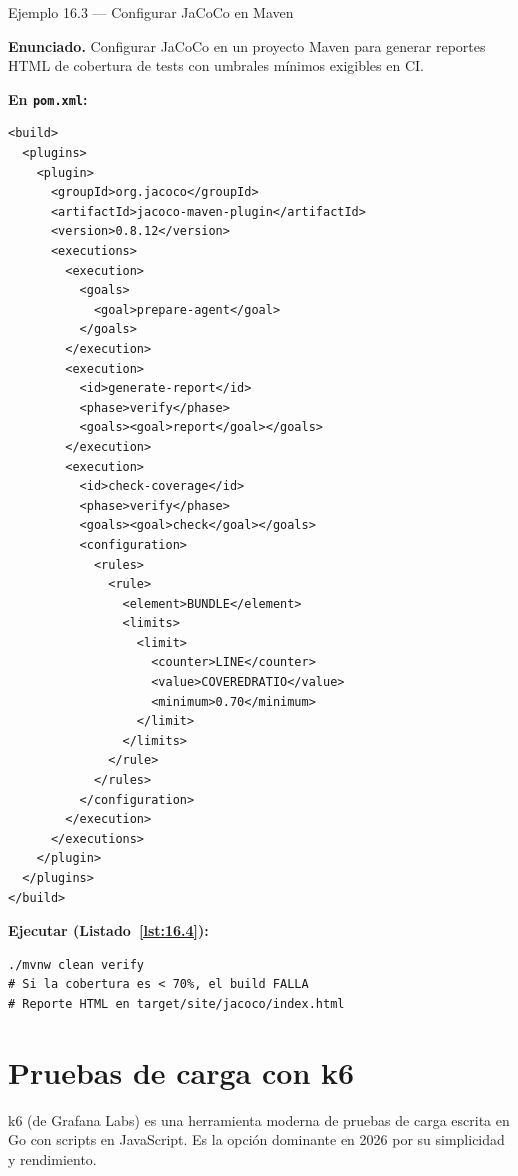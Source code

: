 \begin{cajaejemplo}{Ejemplo 16.3 --- Configurar JaCoCo en Maven}

\textbf{Enunciado.} Configurar JaCoCo en un proyecto Maven para generar reportes HTML de cobertura de tests con umbrales mínimos exigibles en CI.

\textbf{En \texttt{pom.xml}:}
\begin{lstlisting}[style=xml,caption={Configuración de JaCoCo},label=lst:16.3]
<build>
  <plugins>
    <plugin>
      <groupId>org.jacoco</groupId>
      <artifactId>jacoco-maven-plugin</artifactId>
      <version>0.8.12</version>
      <executions>
        <execution>
          <goals>
            <goal>prepare-agent</goal>
          </goals>
        </execution>
        <execution>
          <id>generate-report</id>
          <phase>verify</phase>
          <goals><goal>report</goal></goals>
        </execution>
        <execution>
          <id>check-coverage</id>
          <phase>verify</phase>
          <goals><goal>check</goal></goals>
          <configuration>
            <rules>
              <rule>
                <element>BUNDLE</element>
                <limits>
                  <limit>
                    <counter>LINE</counter>
                    <value>COVEREDRATIO</value>
                    <minimum>0.70</minimum>
                  </limit>
                </limits>
              </rule>
            </rules>
          </configuration>
        </execution>
      </executions>
    </plugin>
  </plugins>
</build>
\end{lstlisting}

\textbf{Ejecutar (Listado~\ref{lst:16.4}):}
\begin{lstlisting}[style=shell,numbers=none,caption={Ejemplo de Shell},label=lst:16.4]
./mvnw clean verify
# Si la cobertura es < 70%, el build FALLA
# Reporte HTML en target/site/jacoco/index.html
\end{lstlisting}
\end{cajaejemplo}

\section{Pruebas de carga con k6}

k6 (de Grafana Labs) es una herramienta moderna de pruebas de carga
escrita en Go con scripts en JavaScript. Es la opción dominante en
2026 por su simplicidad y rendimiento.

